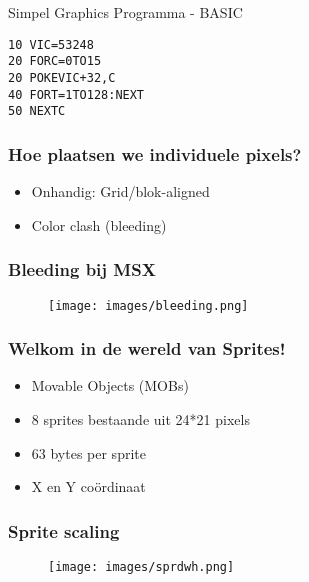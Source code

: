 
\begin{frame}[fragile]{Simpel Graphics Programma - BASIC}

\begin{lstlisting}
10 VIC=53248
20 FORC=0TO15
20 POKEVIC+32,C
40 FORT=1TO128:NEXT
50 NEXTC
\end{lstlisting}

\end{frame}


\begin{frame}
\frametitle{Hoe plaatsen we individuele pixels?}

\begin{itemize}
\item Onhandig: Grid/blok-aligned
\item Color clash (bleeding)
\end{itemize}

\end{frame}


\begin{frame}
\frametitle{Bleeding bij MSX}

\begin{figure}
\texttt{[image: images/bleeding.png]}
\end{figure}

\end{frame}


\begin{frame}
\frametitle{Welkom in de wereld van Sprites!}

\begin{itemize}
\item Movable Objects (MOBs)
\item 8 sprites bestaande uit 24*21 pixels
\item 63 bytes per sprite
\item X en Y co\"ordinaat
\end{itemize}

\end{frame}


\begin{frame}
\frametitle{Sprite scaling}

\begin{figure}
\texttt{[image: images/sprdwh.png]}
\end{figure}

\end{frame}

